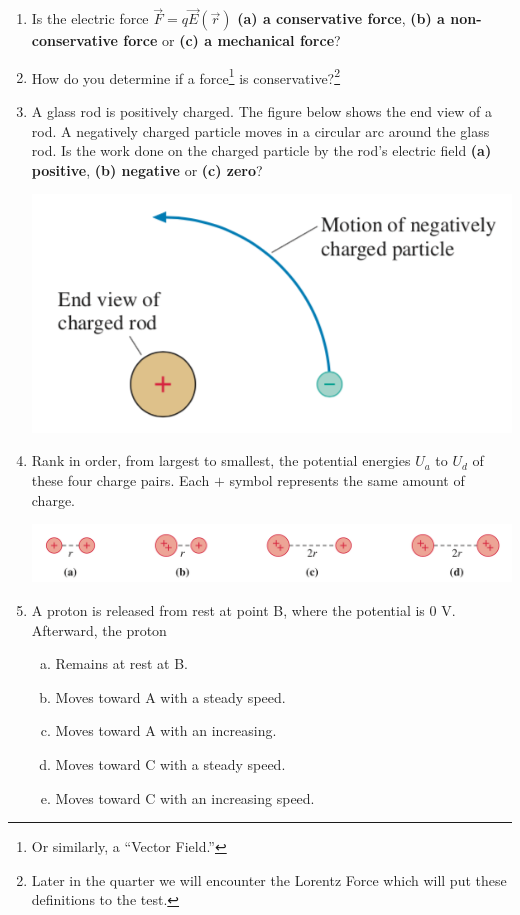 \documentclass[12pt]{article}
\begin{document}
\begin{enumerate}

\item Is the electric force $\vec{F} = q\vec{E}(\vec{r})$ {\bfseries (a) a conservative force}, {\bfseries (b) a non-conservative force} or {\bfseries (c) a mechanical force}?
\vspace{25mm}
\item How do you determine if a force\footnote{Or similarly, a ``Vector Field.''} is conservative?\footnote{Later in the quarter we will encounter the Lorentz Force which will put these definitions to the test.}
\vspace{10mm}

\newpage

\item A glass rod is positively charged. The figure below shows the end view of a rod. A negatively charged particle moves in a circular arc around the glass rod. Is the work done on the charged particle by the rod's electric field {\bfseries (a) positive}, {\bfseries(b) negative} or {\bfseries (c) zero}?
\begin{center}
\includegraphics[width=.4\linewidth]{W3-fig1}
\end{center}
\vspace{20mm}
\item Rank in order, from largest to smallest, the potential energies $U_a$ to $U_d$ of these four charge pairs. Each $+$ symbol represents the same amount of charge.
\begin{center}
\includegraphics[width=.9\linewidth]{W3-fig2}
\end{center}
\vspace{20mm}


\item A proton is released from rest at point B, where the potential is $0$ V. Afterward, the proton
	\begin{enumerate}[(a)]
	\item Remains at rest at B.
	\item Moves toward A with a steady speed.
	\item Moves toward A with an increasing.
	\item Moves toward C with a steady speed.
	\item Moves toward C with an increasing speed.
	\end{enumerate}


\end{enumerate}
\end{document}
